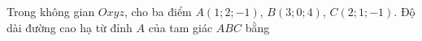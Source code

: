 \begin{ex}
Trong không gian $Oxyz$, cho ba điểm $A(1;2;-1)$, $B(3;0;4)$, $C(2;1;-1)$. Độ dài đường cao hạ từ đỉnh $A$ của tam giác $ABC$ bằng
\end{ex}
